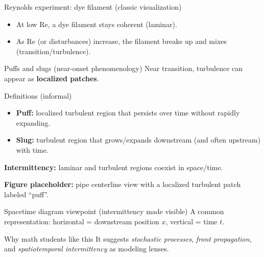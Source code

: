 \documentclass[aspectratio=169]{beamer}
\newcommand{\Rey}{\mathrm{Re}}
\begin{document}
\begin{frame}{Reynolds experiment: dye filament (classic visualization)}
\begin{itemize}
  \item At low $\Rey$, a dye filament stays coherent (laminar).
  \item As $\Rey$ (or disturbances) increase, the filament breaks up and mixes (transition/turbulence).
\end{itemize}

\vspace{0.6em}
\centering
{}
\end{frame}

\begin{frame}{Puffs and slugs (near-onset phenomenology)}
Near transition, turbulence can appear as \textbf{localized patches}.

\begin{block}{Definitions (informal)}
\begin{itemize}
  \item \textbf{Puff:} localized turbulent region that persists over time without rapidly expanding.
  \item \textbf{Slug:} turbulent region that grows/expands downstream (and often upstream) with time.
\end{itemize}
\end{block}

\textbf{Intermittency:} laminar and turbulent regions coexist in space/time.

\textbf{Figure placeholder:} pipe centerline view with a localized turbulent patch labeled ``puff''.
\end{frame}

\begin{frame}{Spacetime diagram viewpoint (intermittency made visible)}
A common representation: horizontal = downstream position $x$, vertical = time $t$.

\centering
{}

\vspace{0.8em}
\begin{block}{Why math students like this}
It suggests \emph{stochastic processes}, \emph{front propagation}, and \emph{spatiotemporal intermittency} as modeling lenses.
\end{block}
\end{frame}
\end{document}

